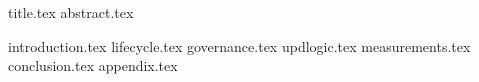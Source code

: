 \documentclass[11pt]{llncs}
\begin{document}
{title.tex}
{abstract.tex}

{introduction.tex}
{lifecycle.tex}
{governance.tex}
{updlogic.tex}
{measurements.tex}
{conclusion.tex}
{appendix.tex}


\end{document}
